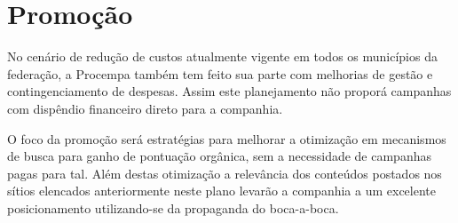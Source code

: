 \chapter{Promoção}

No cenário de redução de custos atualmente vigente em todos os municípios da federação, a Procempa também tem feito sua parte com melhorias de gestão e contingenciamento de despesas. Assim este planejamento não proporá campanhas com dispêndio financeiro direto para a companhia.

O foco da promoção será estratégias para melhorar a otimização em mecanismos de busca para ganho de pontuação orgânica, sem a necessidade de campanhas pagas para tal. Além destas otimização a relevância dos conteúdos postados nos sítios elencados anteriormente neste plano levarão a companhia a um excelente posicionamento utilizando-se da propaganda do boca-a-boca.
